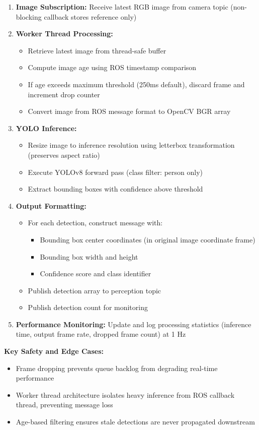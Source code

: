 \documentclass[12pt,a4paper]{report}
\begin{document}
\begin{enumerate}
    \item \textbf{Image Subscription:} Receive latest \ac{RGB} image from camera topic (non-blocking callback stores reference only)
    \item \textbf{Worker Thread Processing:}
    \begin{itemize}
        \item Retrieve latest image from thread-safe buffer
        \item Compute image age using ROS timestamp comparison
        \item If age exceeds maximum threshold (250ms default), discard frame and increment drop counter
        \item Convert image from ROS message format to OpenCV \ac{BGR} array
    \end{itemize}
    \item \textbf{YOLO Inference:}
    \begin{itemize}
        \item Resize image to inference resolution using letterbox transformation (preserves aspect ratio)
        \item Execute YOLOv8 forward pass (class filter: person only)
        \item Extract bounding boxes with confidence above threshold
    \end{itemize}
    \item \textbf{Output Formatting:}
    \begin{itemize}
        \item For each detection, construct message with:
        \begin{itemize}
            \item Bounding box center coordinates (in original image coordinate frame)
            \item Bounding box width and height
            \item Confidence score and class identifier
        \end{itemize}
        \item Publish detection array to perception topic
        \item Publish detection count for monitoring
    \end{itemize}
    \item \textbf{Performance Monitoring:} Update and log processing statistics (inference time, output frame rate, dropped frame count) at 1 Hz
\end{enumerate}
\textbf{Key Safety and Edge Cases:}
\begin{itemize}
    \item Frame dropping prevents queue backlog from degrading real-time performance
    \item Worker thread architecture isolates heavy inference from ROS callback thread, preventing message loss
    \item Age-based filtering ensures stale detections are never propagated downstream
\end{itemize}
\end{document}
